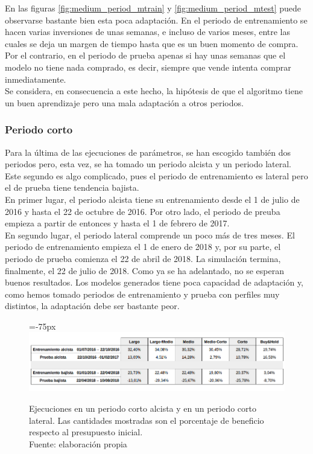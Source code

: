 En las figuras \ref{fig:medium_period_mtrain} y \ref{fig:medium_period_mtest} puede observarse bastante bien esta poca adaptaci\'on. En el periodo de entrenamiento se hacen varias inversiones de unas semanas, e incluso de varios meses, entre las cuales se deja un margen de tiempo hasta que es un buen momento de compra. Por el contrario, en el periodo de prueba apenas si hay unas semanas que el modelo no tiene nada comprado, es decir, siempre que vende intenta comprar inmediatamente.\\

Se considera, en consecuencia a este hecho, la hip\'otesis de que el algoritmo tiene un buen aprendizaje pero una mala adaptaci\'on a otros periodos.\\

     	
\subsubsection{Periodo corto}

Para la \'ultima de las ejecuciones de par\'ametros, se han escogido tambi\'en dos periodos pero, esta vez, se ha tomado un periodo alcista y un periodo lateral. Este segundo es algo complicado, pues el periodo de entrenamiento es lateral pero el de prueba tiene tendencia bajista. \\

En primer lugar, el periodo alcista tiene su entrenamiento desde el 1 de julio de 2016 y hasta el 22 de octubre de 2016. Por otro lado, el periodo de preuba empieza a partir de entonces y hasta el 1 de febrero de 2017.\\

En segundo lugar, el periodo lateral comprende un poco m\'as de tres meses. El periodo de entrenamiento empieza el 1 de enero de 2018 y, por su parte, el periodo de prueba comienza el 22 de abril de 2018. La simulaci\'on termina, finalmente, el 22 de julio de 2018. Como ya se ha adelantado, no se esperan buenos resultados. Los modelos generados tiene poca capacidad de adaptaci\'on y, como hemos tomado periodos de entrenamiento y prueba con perfiles muy distintos, la adaptaci\'on debe ser bastante peor.\\

     	\begin{figure}[H]
     		\centering\leftskip=-75px
     		\includegraphics[scale=0.60]{imagenes/Short_period.png}
     		\caption[Ejecuciones en un periodo corto alcista y en un periodo corto lateral]{Ejecuciones en un periodo corto alcista y en un periodo corto lateral. Las cantidades mostradas son el porcentaje de beneficio respecto al presupuesto inicial.\\ Fuente: elaboraci\'on propia}
     		\label{fig:short_period}
     	\end{figure}

